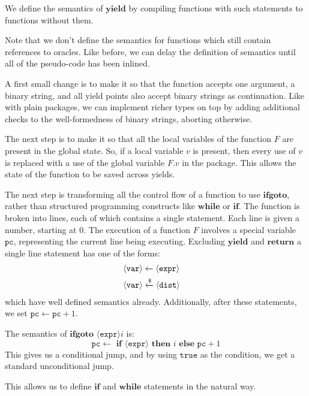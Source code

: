 \begin{definition}
\label{def:yield}
We define the semantics of $\textbf{yield}$ by compiling functions with
such statements to functions without them.

Note that we don't define the semantics for functions which still contain references
to oracles.
Like before, we can delay the definition of semantics until all of the
pseudo-code has been inlined.

A first small change is to make it so that the function accepts one
argument, a binary string, and all yield points also accept binary
strings as continuation.
Like with plain packages, we can implement richer types on top by adding
additional checks to the well-formedness of binary strings, aborting
otherwise.

The next step is to make it so that all the local variables of the function $F$
are present in the global state.
So, if a local variable $v$ is present, then every use
of $v$ is replaced with a use of the global variable $F.v$ in the package.
This allows the state of the function to be saved across yields.

The next step is transforming all the control flow of a function to
use $\textbf{ifgoto}$, rather than structured programming constructs like
$\textbf{while}$ or $\textbf{if}$.
The function is broken into lines, each of which contains a single statement.
Each line is given a number, starting at $0$.
The execution of a function $F$ involves a special variable $\texttt{pc}$,
representing the current line being executing.
Excluding $\textbf{yield}$ and $\textbf{return}$ a single line statement has one of the
forms:
$$
\begin{aligned}
&\langle \texttt{var} \rangle \gets \langle \texttt{expr} \rangle\cr
&\langle \texttt{var} \rangle \xleftarrow{\$} \langle \texttt{dist} \rangle\cr
\end{aligned}
$$
which have well defined semantics already.
Additionally, after these statements, we set $\texttt{pc} \gets \texttt{pc} + 1$.

The semantics of $\textbf{ifgoto } \langle \texttt{expr} \rangle i$ is:
$$
\texttt{pc} \gets \textbf{ if } \langle \texttt{expr} \rangle \textbf{ then } i \textbf{ else } \texttt{pc} + 1
$$
This gives us a conditional jump, and by using $\texttt{true}$ as the condition,
we get a standard unconditional jump.

This allows us to define $\textbf{if}$ and $\textbf{while}$ statements
in the natural way.


\end{definition}
